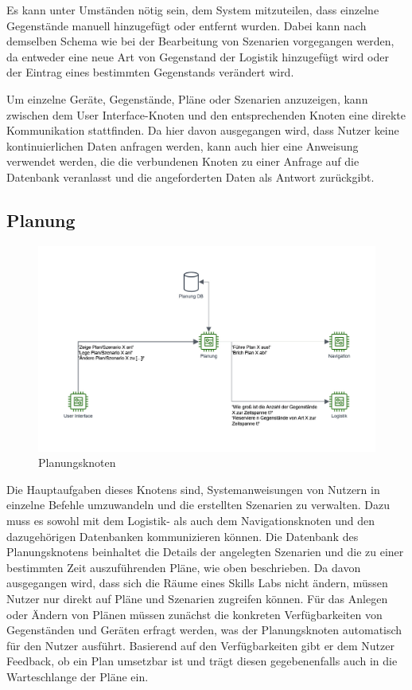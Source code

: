 Es kann unter Umständen nötig sein, dem System mitzuteilen, dass einzelne Gegenstände manuell hinzugefügt oder entfernt wurden. Dabei kann nach demselben Schema wie bei der Bearbeitung von Szenarien vorgegangen werden, da entweder eine neue Art von Gegenstand der Logistik hinzugefügt wird oder der Eintrag eines bestimmten Gegenstands verändert wird.

Um einzelne Geräte, Gegenstände, Pläne oder Szenarien anzuzeigen, kann zwischen dem User Interface-Knoten und den entsprechenden Knoten eine direkte Kommunikation stattfinden. Da hier davon ausgegangen wird, dass Nutzer keine kontinuierlichen Daten anfragen werden, kann auch hier eine Anweisung verwendet werden, die die verbundenen Knoten zu einer Anfrage auf die Datenbank veranlasst und die angeforderten Daten als Antwort zurückgibt.



\FloatBarrier
\newpage \subsection{Planung}

\begin{figure}[h]
\centering
\includegraphics[width=\textwidth]{Bilder/3_Planung.png}
\caption{Planungsknoten}
\end{figure}

Die Hauptaufgaben dieses Knotens sind, Systemanweisungen von Nutzern in einzelne Befehle umzuwandeln und die erstellten Szenarien zu verwalten. Dazu muss es sowohl mit dem Logistik- als auch dem Navigationsknoten und den dazugehörigen Datenbanken kommunizieren können. Die Datenbank des Planungsknotens beinhaltet die Details der angelegten Szenarien und die zu einer bestimmten Zeit auszuführenden Pläne, wie oben beschrieben. Da davon ausgegangen wird, dass sich die Räume eines Skills Labs nicht ändern, müssen Nutzer nur direkt auf Pläne und Szenarien zugreifen können. Für das Anlegen oder Ändern von Plänen müssen zunächst die konkreten Verfügbarkeiten von Gegenständen und Geräten erfragt werden, was der Planungsknoten automatisch für den Nutzer ausführt. Basierend auf den Verfügbarkeiten gibt er dem Nutzer Feedback, ob ein Plan umsetzbar ist und trägt diesen gegebenenfalls auch in die Warteschlange der Pläne ein.

